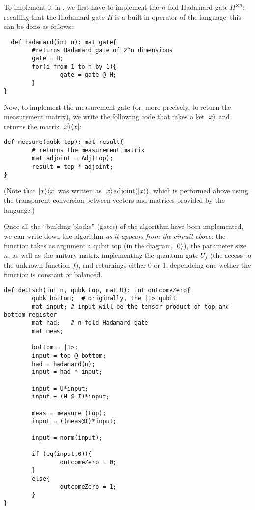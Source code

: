 To implement it in \QL, we first have to implement the $n$-fold Hadamard gate $H^{\otimes n}$; recalling that the Hadamard gate $H$ is a built-in operator of the language, this can be done as follows:
\begin{lstlisting}
  def hadamard(int n): mat gate{
        #returns Hadamard gate of 2^n dimensions
        gate = H; 
        for(i from 1 to n by 1){
                gate = gate @ H;                 
        }       
}
\end{lstlisting}
Now, to implement the measurement gate (or, more precisely, to return the measurement matrix), we write the following code that takes a ket $|x\rangle$ and returns the matrix $|x\rangle\langle x|$:
\begin{lstlisting}
def measure(qubk top): mat result{
        # returns the measurement matrix  
        mat adjoint = Adj(top);
        result = top * adjoint;
}
\end{lstlisting}
(Note that $|x\rangle\langle x|$ was written as $|x\rangle\operatorname{adjoint}(|x\rangle)$, which is performed above using the transparent conversion between vectors and matrices provided by the language.)\medskip

Once all the ``building blocks'' (gates) of the algorithm have been implemented, we can write down the algorithm \emph{as it appears from the circuit above}: the function takes as argument a qubit \textsf{top} (in the diagram, $|0\rangle$), the parameter size $n$, as well as the unitary matrix implementing the quantum  gate $U_f$ (the access to the unknown function $f$), and returnings either 0 or 1, dependeing one wether the function is constant or balanced.
\begin{lstlisting}
def deutsch(int n, qubk top, mat U): int outcomeZero{       
        qubk bottom;  # originally, the |1> qubit    
        mat input; # input will be the tensor product of top and bottom register  
        mat had;   # n-fold Hadamard gate  
        mat meas;

        bottom = |1>;
        input = top @ bottom;
        had = hadamard(n);
        input = had * input;
        
        input = U*input;
        input = (H @ I)*input;
        
        meas = measure (top);        
        input = ((meas@I)*input;
        
        input = norm(input);
        
        if (eq(input,0)){
                outcomeZero = 0;
        }
        else{
                outcomeZero = 1;
        }
}
\end{lstlisting}

